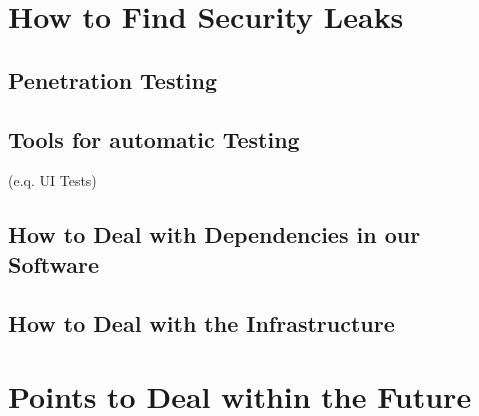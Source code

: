 \section{How to Find Security Leaks}


\subsection{Penetration Testing}


\subsection{Tools for automatic Testing}
(e.q. UI Tests)


\subsection{How to Deal with Dependencies in our Software}
\subsection{How to Deal with the Infrastructure}
\section{Points to Deal within the Future}
